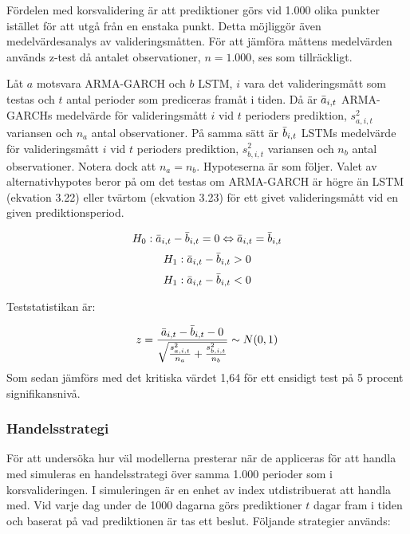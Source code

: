 \documentclass[11pt]{article}
\numberwithin{equation}{section}
\numberwithin{table}{section}
\numberwithin{figure}{section}
\begin{document}
Fördelen med korsvalidering är att prediktioner görs vid 1.000 olika punkter istället för att utgå från en enstaka punkt. Detta möjliggör även medelvärdesanalys av valideringsmåtten. För att jämföra måttens medelvärden används z-test då antalet observationer, $n=1.000$, ses som tillräckligt.

Låt $a$ motsvara ARMA-GARCH och $b$ LSTM, $i$ vara det valideringsmått som testas och $t$ antal perioder som prediceras framåt i tiden. Då är $\Bar{a}_{i,t}$ ARMA-GARCHs medelvärde för valideringsmått $i$ vid $t$ perioders prediktion, $s_{a,i,t}^2$ variansen och $n_a$ antal observationer. På samma sätt är  $\Bar{b}_{i,t}$ LSTMs medelvärde för valideringsmått $i$ vid $t$ perioders prediktion, $s_{b,i,t}^2$ variansen och $n_b$ antal observationer. Notera dock att $n_a = n_b$. Hypoteserna är som följer. Valet av alternativhypotes beror på om det testas om ARMA-GARCH är högre än LSTM (ekvation 3.22) eller tvärtom (ekvation 3.23) för ett givet valideringsmått vid en given prediktionsperiod. 

\begin{equation}
    H_0: \Bar{a}_{i,t} - \Bar{b}_{i,t} = 0 \Leftrightarrow \Bar{a}_{i,t} = \Bar{b}_{i,t}
\end{equation}
\begin{equation}
    H_1: \Bar{a}_{i,t} - \Bar{b}_{i,t} > 0
\end{equation}
\begin{equation}
    H_1: \Bar{a}_{i,t} - \Bar{b}_{i,t} < 0
\end{equation}

Teststatistikan är: 

\begin{equation}
    z = \frac{\Bar{a}_{i,t} - \Bar{b}_{i,t} - 0}{\sqrt{\frac{s_{a,i,t}^2}{n_a}+\frac{s_{b,i,t}^2}{n_b}}} \sim N(0,1)
\end{equation}
Som sedan jämförs med det kritiska värdet 1,64 för ett ensidigt test på 5 procent signifikansnivå.


\subsubsection{Handelsstrategi}
För att undersöka hur väl modellerna presterar när de appliceras för att handla med simuleras en handelsstrategi över samma 1.000 perioder som i korsvalideringen. I simuleringen är en enhet av index utdistribuerat att handla med. Vid varje dag under de 1000 dagarna görs prediktioner $t$ dagar fram i tiden och baserat på vad prediktionen är tas ett beslut. Följande strategier används:
\end{document}

